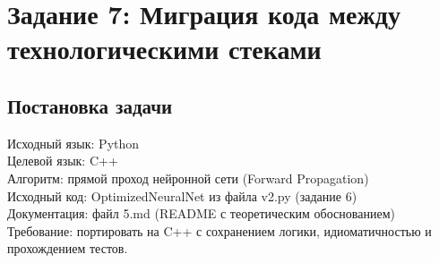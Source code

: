 \section*{Задание 7: Миграция кода между технологическими стеками}
\subsection{Постановка задачи}
\noindent
Исходный язык: Python \\
Целевой язык: C++\\
Алгоритм: прямой проход нейронной сети (Forward Propagation)\\
Исходный код: OptimizedNeuralNet из файла v2.py (задание 6)\\
Документация: файл 5.md (README с теоретическим обоснованием)\\
Требование: портировать на C++ с сохранением логики, идиоматичностью и прохождением тестов.\\
\newpage
